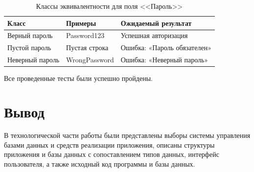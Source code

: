 \newpage

\begin{table}[h]
	\centering
	\caption{Классы эквивалентности для поля <<Пароль>>}
	\label{tbl:password-classes}
	\begin{tabularx}{\textwidth}{|X|X|X|}
		\hline
		\textbf{Класс} & \textbf{Примеры} & \textbf{Ожидаемый результат} \\
		\hline
		Верный пароль & Password123 & Успешная авторизация \\
		\hline
		Пустой пароль & Пустая строка & Ошибка: «Пароль обязателен» \\
		\hline
		Неверный пароль & WrongPassword & Ошибка: «Неверный пароль» \\
		\hline
	\end{tabularx}
\end{table}

Все проведенные тесты были успешно пройдены.

\section{Вывод}

В технологической части работы были представлены выборы системы управления базами данных и средств реализации приложения, описаны структуры приложения и базы данных с сопоставлением типов данных, интерфейс пользователя, а также исходный код программы и базы данных.

\clearpage
